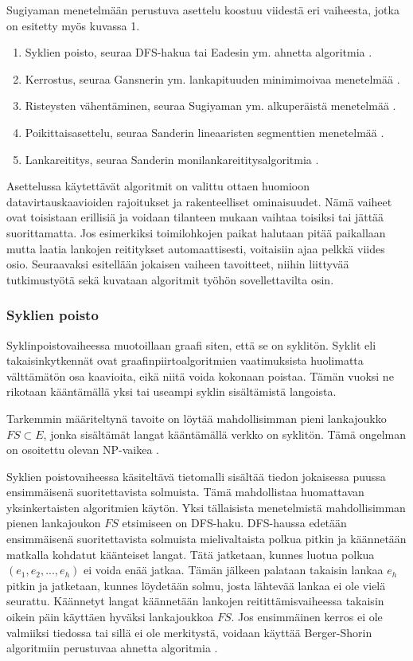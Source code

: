 \documentclass[finnish,12pt]{article}
\begin{document}
Sugiyaman menetelmään perustuva asettelu koostuu viidestä eri vaiheesta, jotka on esitetty myös kuvassa 1.
\begin{enumerate}
  \item Syklien poisto, seuraa DFS-hakua \cite{RefWorks:69} tai Eadesin ym. ahnetta algoritmia \cite{RefWorks:48}.
  \item Kerrostus, seuraa Gansnerin ym. lankapituuden minimimoivaa menetelmää \cite{RefWorks:28}.
  \item Risteysten vähentäminen, seuraa Sugiyaman ym. alkuperäistä menetelmää \cite{RefWorks:9}.
  \item Poikittaisasettelu, seuraa Sanderin lineaaristen segmenttien menetelmää \cite{RefWorks:49}.
  \item Lankareititys, seuraa Sanderin monilankareititysalgoritmia \cite{RefWorks:17}.

\end{enumerate}

Asettelussa käytettävät algoritmit on valittu ottaen huomioon datavirtauskaavioiden rajoitukset ja rakenteelliset ominaisuudet.
Nämä vaiheet ovat toisistaan erillisiä ja voidaan tilanteen mukaan vaihtaa toisiksi tai jättää suorittamatta.
Jos esimerkiksi toimilohkojen paikat halutaan pitää paikallaan mutta laatia lankojen reititykset automaattisesti, voitaisiin ajaa pelkkä viides osio.
Seuraavaksi esitellään jokaisen vaiheen tavoitteet, niihin liittyvää tutkimustyötä sekä kuvataan algoritmit työhön sovellettavilta osin.

		\subsubsection{Syklien poisto}

Syklinpoistovaiheessa muotoillaan graafi siten, että se on syklitön.
Syklit eli takaisinkytkennät ovat graafinpiirtoalgoritmien vaatimuksista huolimatta välttämätön osa kaavioita, eikä niitä voida kokonaan poistaa.
Tämän vuoksi ne rikotaan kääntämällä yksi tai useampi syklin sisältämistä langoista.

Tarkemmin määriteltynä tavoite on löytää mahdollisimman pieni lankajoukko $FS \subset E $, jonka sisältämät langat kääntämällä verkko on syklitön.
Tämä ongelman on osoitettu olevan NP-vaikea \cite{RefWorks:65}. 

Syklien poistovaiheessa käsiteltävä tietomalli sisältää tiedon jokaisessa puussa ensimmäisenä suoritettavista solmuista.
Tämä mahdollistaa huomattavan yksinkertaisten algoritmien käytön.
Yksi tällaisista menetelmistä mahdollisimman pienen lankajoukon $FS$ etsimiseen on DFS-haku.
DFS-haussa edetään ensimmäisenä suoritettavista solmuista mielivaltaista polkua pitkin ja käännetään matkalla kohdatut käänteiset langat. Tätä jatketaan, kunnes luotua polkua $(e_1,e_2, ..., e_h)$ ei voida enää jatkaa.
Tämän jälkeen palataan takaisin lankaa $e_h$ pitkin ja jatketaan, kunnes löydetään solmu, josta lähtevää lankaa ei ole vielä seurattu. \cite{RefWorks:69}
Käännetyt langat käännetään lankojen reitittämisvaiheessa takaisin oikein päin käyttäen hyväksi lankajoukkoa $FS$.
Jos ensimmäinen kerros ei ole valmiiksi tiedossa tai sillä ei ole merkitystä, voidaan käyttää Berger-Shorin algoritmiin \cite{RefWorks:68} perustuvaa ahnetta algoritmia \cite{RefWorks:48}.
\end{document}
